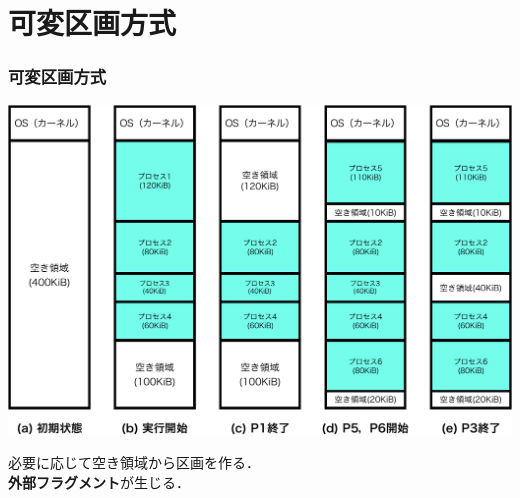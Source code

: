 \documentclass{beamer}                   %
\begin{document}
\section{可変区画方式}
\begin{frame}
  \frametitle{可変区画方式}
  \begin{center}
    \includegraphics[scale=0.45]{Fig/variablePartition-crop.pdf}\\
  \end{center}
  必要に応じて空き領域から区画を作る．\\
  {\bf 外部フラグメント}が生じる．
\end{frame}
\end{document}
